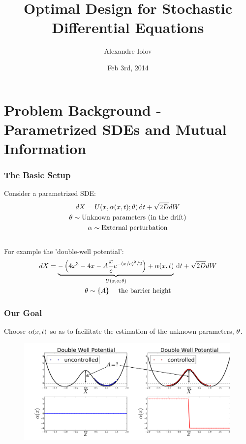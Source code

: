\documentclass{beamer}
\title[Opt-Design for SDEs]
{Optimal Design for Stochastic Differential Equations}
\author{Alexandre Iolov}
\date{Feb 3rd, 2014}
\begin{document}
\begin{frame}
\titlepage
\end{frame}

\begin{frame}
\tableofcontents[pausesections]
\end{frame}

\section{Problem Background - Parametrized SDEs and Mutual Information}  
\begin{frame}
\frametitle{The Basic Setup} 
Consider  
a parametrized SDE:
\begin{equation*}
\begin{gathered}
dX = U(x,{\alpha}(x,t); {\theta}) \, \mathrm{d} t + \sqrt{2D} dW
\\
{\theta} \sim \textrm{Unknown parameters (in the drift)}
\\
{\alpha} \sim \textrm{External perturbation}
\end{gathered}
\end{equation*}
\\
 {
 For example the 'double-well potential':
\begin{equation*}
\begin{gathered}
dX = \underbrace{ -\left( 4x^3 - 4x -A \frac xc e^{-(x/c)^2/2} \right) +
{\alpha}(x,t)}_{U(x,{\alpha}; {\theta})} \, \mathrm{d} t + \sqrt{2D} dW
\\
{\theta} \sim \{A\} \quad \textrm{ the barrier height}
\end{gathered}
\end{equation*}
}
\end{frame}

\begin{frame}
\frametitle{Our Goal}
Choose ${\alpha}(x,t)$ so as to facilitate the estimation of the unknown parameters,
${\theta}$.
\begin{figure}
\includegraphics[width=0.99\textwidth]
{Figs/Simulator/doublewell_example_trajectory.pdf}
\end{figure}

\end{frame}
  
\end{document}
